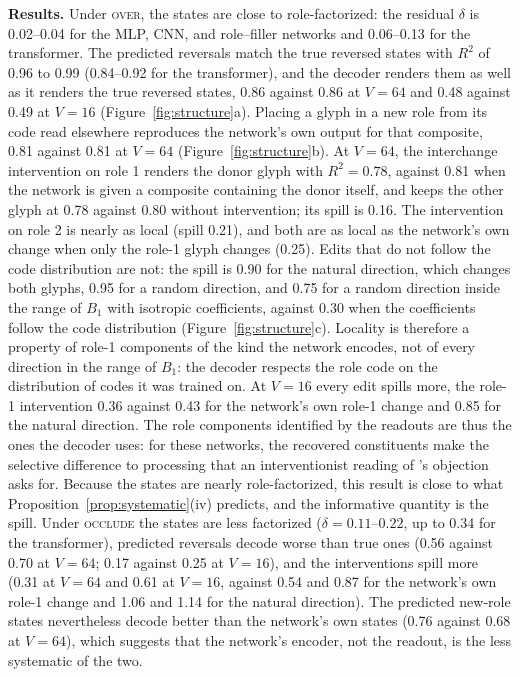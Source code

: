 \documentclass[10pt]{article}
\theoremstyle{plain}
\theoremstyle{remark}
\begin{document}
\textbf{Results.} Under \textsc{over}, the states are close to role-factorized: the residual $\delta$ is 0.02--0.04 for the MLP, CNN, and role--filler networks and 0.06--0.13 for the transformer. The predicted reversals match the true reversed states with $R^2$ of 0.96 to 0.99 (0.84--0.92 for the transformer), and the decoder renders them as well as it renders the true reversed states, 0.86 against 0.86 at $V = 64$ and 0.48 against 0.49 at $V = 16$ (Figure~\ref{fig:structure}a). Placing a glyph in a new role from its code read elsewhere reproduces the network's own output for that composite, 0.81 against 0.81 at $V = 64$ (Figure~\ref{fig:structure}b). At $V = 64$, the interchange intervention on role 1 renders the donor glyph with $R^2 = 0.78$, against 0.81 when the network is given a composite containing the donor itself, and keeps the other glyph at 0.78 against 0.80 without intervention; its spill is 0.16. The intervention on role 2 is nearly as local (spill 0.21), and both are as local as the network's own change when only the role-1 glyph changes (0.25). Edits that do not follow the code distribution are not: the spill is 0.90 for the natural direction, which changes both glyphs, 0.95 for a random direction, and 0.75 for a random direction inside the range of $B_1$ with isotropic coefficients, against 0.30 when the coefficients follow the code distribution (Figure~\ref{fig:structure}c). Locality is therefore a property of role-1 components of the kind the network encodes, not of every direction in the range of $B_1$: the decoder respects the role code on the distribution of codes it was trained on. At $V = 16$ every edit spills more, the role-1 intervention 0.36 against 0.43 for the network's own role-1 change and 0.85 for the natural direction. The role components identified by the readouts are thus the ones the decoder uses: for these networks, the recovered constituents make the selective difference to processing that an interventionist reading of \citet{fodor1990}'s objection asks for. Because the states are nearly role-factorized, this result is close to what Proposition~\ref{prop:systematic}(iv) predicts, and the informative quantity is the spill. Under \textsc{occlude} the states are less factorized ($\delta = 0.11$--$0.22$, up to 0.34 for the transformer), predicted reversals decode worse than true ones (0.56 against 0.70 at $V = 64$; 0.17 against 0.25 at $V = 16$), and the interventions spill more (0.31 at $V = 64$ and 0.61 at $V = 16$, against 0.54 and 0.87 for the network's own role-1 change and 1.06 and 1.14 for the natural direction). The predicted new-role states nevertheless decode better than the network's own states (0.76 against 0.68 at $V = 64$), which suggests that the network's encoder, not the readout, is the less systematic of the two.
\end{document}
